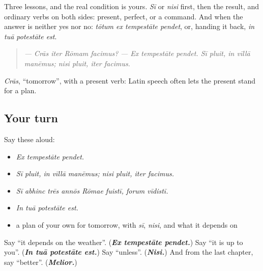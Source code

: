 \begin{grammarlens}[title={What you've built}]
Three lessons, and the real condition is yours. \emph{Sī} or \emph{nisi} first, then the result, and ordinary verbs on both sides: present, perfect, or a command. And when the answer is neither yes nor no: \emph{tōtum ex tempestāte pendet}, or, handing it back, \emph{in tuā potestāte est}.

\begin{quote}
\emph{— Crās iter Rōmam facimus?} \emph{— Ex tempestāte pendet. Sī pluit, in vīllā manēmus; nisi pluit, iter facimus.}
\end{quote}

\emph{Crās}, \textquotedblleft{}tomorrow\textquotedblright{}, with a present verb: Latin speech often lets the present stand for a plan.
\end{grammarlens}

\subsection*{Your turn}
Say these aloud:

\begin{itemize}
\raggedright
  \item \emph{Ex tempestāte pendet.}
  \item \emph{Sī pluit, in vīllā manēmus; nisi pluit, iter facimus.}
  \item \emph{Sī abhinc trēs annōs Rōmae fuistī, forum vīdistī.}
  \item \emph{In tuā potestāte est.}
  \item a plan of your own for tomorrow, with \emph{sī}, \emph{nisi}, and what it depends on
\end{itemize}

\begin{tcolorbox}[breakable,colback=teal!4,colframe=teal!35!black,title={Before you move on}]
Say \textquotedblleft{}it depends on the weather\textquotedblright{}. (\emph{\textbf{Ex tempestāte pendet.}}) Say \textquotedblleft{}it is up to you\textquotedblright{}. (\emph{\textbf{In tuā potestāte est.}}) Say \textquotedblleft{}unless\textquotedblright{}. (\emph{\textbf{Nisi.}}) And from the last chapter, say \textquotedblleft{}better\textquotedblright{}. (\emph{\textbf{Melior.}})
\end{tcolorbox}

